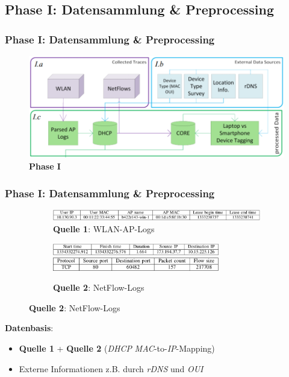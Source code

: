 \documentclass{beamer}
\begin{document}
\subsection{\textbf{Phase I}: Datensammlung \& Preprocessing}

\begin{frame}
  \frametitle{Phase I: Datensammlung \& Preprocessing}
  \begin{figure}
    \centering
    \includegraphics[width=\textwidth]{images/phase1.png}
    \caption*{\textbf{Phase I}}
  \end{figure}  
\end{frame}

\begin{frame}
  \frametitle{Phase I: Datensammlung \& Preprocessing}

  \begin{figure}[H]
    \centering
    \begin{subfigure}[b]{\textwidth}
      \centering
      \includegraphics[width=\textwidth]{images/AP_entry.png}
      \caption*{\textbf{Quelle 1}: WLAN-AP-Logs}
    \end{subfigure}

    \begin{subfigure}[b]{\textwidth}
      \centering
      \includegraphics[width=0.8\textwidth]{images/netflow_entry_p1.png}
      \includegraphics[width=0.8\textwidth]{images/netflow_entry_p2.png}
      \caption*{\textbf{Quelle 2}: NetFlow-Logs}
    \end{subfigure}
  \end{figure}
  
  \textbf{Datenbasis}:
  
  \begin{itemize}
    \item \textbf{Quelle 1} + \textbf{Quelle 2} (\textit{DHCP} \textit{MAC}-to-\textit{IP}-Mapping)
    \item Externe Informationen z.B. durch \textit{rDNS} und \textit{OUI}
    
  \end{itemize}
      
\end{frame}
\end{document}
